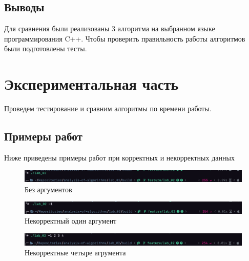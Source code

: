 \documentclass[a4paper,12pt]{article}
\begin{document}
\subsection{Выводы}

Для сравнения были реализованы 3 алгоритма на выбранном языке
программирования C++. Чтобы проверить правильность работы алгоритмов
были подготовлены тесты.

\newpage
\section{Экспериментальная часть}

Проведем тестирование и сравним алгоритмы по времени работы.

\subsection{Примеры работ}

Ниже приведены примеры работ при корректных и некорректных данных

\begin{figure}[H]
    \centering
    \includegraphics[scale=0.5]{zero_arg}
    \caption{Без аргументов}
    \label{img:zero-arg}
\end{figure}

\begin{figure}[H]
    \centering
    \includegraphics[scale=0.5]{less_arg}
    \caption{Некорректный один аргумент}
    \label{img:less-arg}
\end{figure}

\begin{figure}[H]
    \centering
    \includegraphics[scale=0.5]{less_four_arg}
    \caption{Некорректные четыре агрумента}
    \label{img:less-four-arg}
\end{figure}
\end{document}
